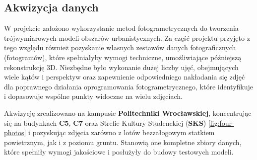 \subsection{Akwizycja danych}
W projekcie założono wykorzystanie metod fotogrametrycznych do tworzenia trójwymiarowych modeli 
obszarów urbanistycznych. Za część projektu przyjęto z tego względu również pozyskanie własnych zestawów 
danych fotograficznych (fotogramów), które spełniałyby wymogi techniczne, umożliwiające późniejszą 
rekonstrukcję 3D. Niezbędne było wykonanie dużej liczby ujęć, obejmujących wiele kątów i perspektyw oraz 
zapewnienie odpowiedniego nakładania się zdjęć dla poprawnego działania oprogramowania fotogrametrycznego, 
które identyfikuje i dopasowuje wspólne punkty widoczne na wielu zdjęciach.

Akwizycję zrealizowano na kampusie \textbf{Politechniki Wrocławskiej}, koncentrując się na budynkach \textbf{C5}, \textbf{C7} oraz 
Strefie Kultury Studenckiej (\textbf{SKS}) \ref{fig:four-photos} i pozyskując zdjęcia zarówno z lotów bezzałogowym statkiem powietrznym, 
jak i z poziomu gruntu. Stanowią one kompletne zbiory danych, które spełniły wymogi jakościowe 
i posłużyły do budowy testowych modeli. 

